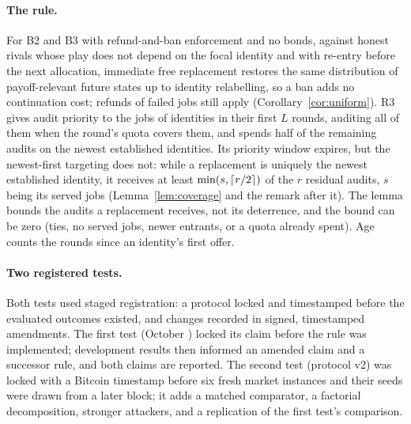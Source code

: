 \documentclass[11pt]{article}
\begin{document}
\paragraph{The rule.} For B2 and B3 with refund-and-ban enforcement and no bonds, against honest rivals whose play does not depend on the focal identity and with re-entry before the next allocation, immediate free replacement restores the same distribution of payoff-relevant future states up to identity relabelling, so a ban adds no continuation cost; refunds of failed jobs still apply (Corollary~\ref{cor:uniform}). R3 gives audit priority to the jobs of identities in their first $L$ rounds, auditing all of them when the round's quota covers them, and spends half of the remaining audits on the newest established identities. Its priority window expires, but the newest-first targeting does not: while a replacement is uniquely the newest established identity, it receives at least $\min(s, \lceil r/2 \rceil)$ of the $r$ residual audits, $s$ being its served jobs (Lemma~\ref{lem:coverage} and the remark after it). The lemma bounds the audits a replacement receives, not its deterrence, and the bound can be zero (ties, no served jobs, newer entrants, or a quota already spent). Age counts the rounds since an identity's first offer.

\paragraph{Two registered tests.} Both tests used staged registration: a protocol locked and timestamped before the evaluated outcomes existed, and changes recorded in signed, timestamped amendments. The first test (October ) locked its claim before the rule was implemented; development results then informed an amended claim and a successor rule, and both claims are reported. The second test (protocol v2) was locked with a Bitcoin timestamp before six fresh market instances and their seeds were drawn from a later block; it adds a matched comparator, a factorial decomposition, stronger attackers, and a replication of the first test's comparison.
\end{document}
